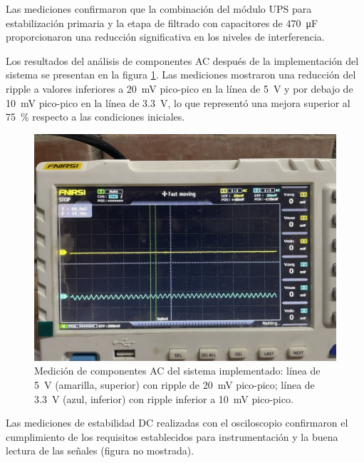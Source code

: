 Las mediciones confirmaron que la combinación del módulo UPS para estabilización primaria y la etapa de filtrado con capacitores de \SI{470}{\micro\farad} proporcionaron una reducción significativa en los niveles de interferencia.



Los resultados del análisis de componentes AC después de la implementación del sistema se presentan en la figura \ref{fig:fuente_filtrada_ac}. Las mediciones mostraron una reducción del ripple a valores inferiores a \SI{20}{\milli\volt} pico-pico en la línea de \SI{5}{\volt} y por debajo de \SI{10}{\milli\volt} pico-pico en la línea de \SI{3.3}{\volt}, lo que representó una mejora superior al \SI{75}{\percent} respecto a las condiciones iniciales.

\begin{figure}[h]
	\centering
	\includegraphics[width=0.8\linewidth]{Figures/test_fuente_AC.JPEG}
	\caption{Medición de componentes AC del sistema implementado: línea de \SI{5}{\volt} (amarilla, superior) con ripple de \SI{20}{\milli\volt} pico-pico; línea de \SI{3.3}{\volt} (azul, inferior) con ripple inferior a \SI{10}{\milli\volt} pico-pico.}
	\label{fig:fuente_filtrada_ac}
\end{figure}


Las mediciones de estabilidad DC realizadas con el osciloscopio confirmaron el cumplimiento de los requisitos establecidos para instrumentación y la buena lectura de las señales (figura no mostrada). %


